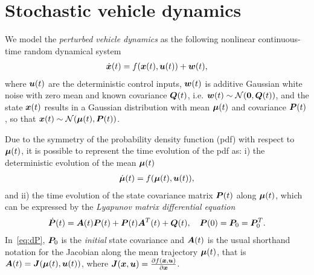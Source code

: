 \section{Stochastic vehicle dynamics}
\label{sec:stochastic_vehicle_dynamics}

We model the \emph{perturbed vehicle dynamics} as the following nonlinear continuous-time random dynamical system
\begin{align}
\dot{\boldsymbol{x}}(t) = f(\boldsymbol{x}(t), \boldsymbol{u}(t)) + \boldsymbol{w}(t),
\end{align}
where $\boldsymbol{u}(t)$ are the deterministic control inputs, $\boldsymbol{w}(t)$ is additive Gaussian white noise with zero mean and known covariance $\boldsymbol{Q}(t)$, i.e. $\boldsymbol{w}(t) \sim \mathcal{N}(\boldsymbol{0}, \boldsymbol{Q}(t))$, and the state $\boldsymbol{x}(t)$ results in a Gaussian distribution with mean $\boldsymbol{\mu}(t)$ and covariance $\boldsymbol{P}(t)$, so that $\boldsymbol{x}(t) \sim \mathcal{N}(\boldsymbol{\mu}(t), \boldsymbol{P}(t))$.

Due to the symmetry of the probability density function (pdf) with respect to $\boldsymbol{\mu}(t)$, it is possible to represent the time evolution of the pdf as: i) the deterministic evolution of the mean $\boldsymbol{\mu}(t)$
\begin{align}\label{eq:meandynamics}
\dbmu(t) = f(\bmu(t), \bu(t)),
\end{align}
and ii) the time evolution of the state covariance matrix $\boldsymbol{P}(t)$ along $\boldsymbol{\mu}(t)$, which can be expressed by the \emph{Lyapunov matrix differential equation}
\begin{align}\label{eq:dP}
\dbP(t) = \bA(t) \bP(t) + \bP(t) \bA^T(t) + \bQ(t),\quad \bP(0) = \bP_0 = \bP_0^T.
\end{align}
In~\eqref{eq:dP}, $\boldsymbol{P}_0$ is the \emph{initial} state covariance and $\boldsymbol{A}(t)$ is the usual shorthand notation for the Jacobian along the mean trajectory $\boldsymbol{\mu}(t)$, that is $\boldsymbol{A}(t)=\boldsymbol{J}(\boldsymbol{\mu}(t),\boldsymbol{u}(t))$, where $\boldsymbol{J}(\boldsymbol{x}, \boldsymbol{u}) = \frac{\partial f(\boldsymbol{x}, \boldsymbol{u})}{\partial \boldsymbol{x}}$.


